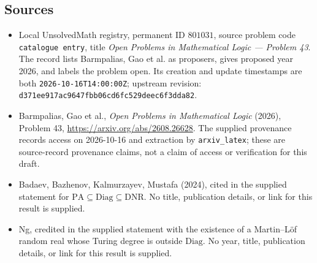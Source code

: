 \documentclass[11pt]{article}
\begin{document}
\subsection{Sources}
\begin{itemize}
\item Local UnsolvedMath registry, permanent ID \(801031\), source problem code \texttt{catalogue entry}, title \emph{Open Problems in Mathematical Logic --- Problem 43}. The record lists Barmpalias, Gao et al. as proposers, gives proposed year 2026, and labels the problem open. Its creation and update timestamps are both \texttt{2026-10-16T14:00:00Z}; upstream revision: \texttt{d371ee917ac9647fbb06cd6fc529deec6f3dda82}.
\item Barmpalias, Gao et al., \emph{Open Problems in Mathematical Logic} (2026), Problem 43, \url{https://arxiv.org/abs/2608.26628}. The supplied provenance records access on 2026-10-16 and extraction by \texttt{arxiv\_latex}; these are source-record provenance claims, not a claim of access or verification for this draft.
\item Badaev, Bazhenov, Kalmurzayev, Mustafa (2024), cited in the supplied statement for \(\mathrm{PA}\subseteq\mathrm{Diag}\subseteq\mathrm{DNR}\). No title, publication details, or link for this result is supplied.
\item Ng, credited in the supplied statement with the existence of a Martin--L\"of random real whose Turing degree is outside \(\mathrm{Diag}\). No year, title, publication details, or link for this result is supplied.
\end{itemize}
\end{document}
